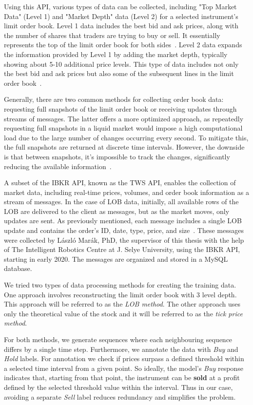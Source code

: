 \documentclass[a4paper,oneside,onecolumn,12pt]{book}
\begin{document}
	Using this API, various types of data can be collected, including "Top Market Data" (Level 1) and "Market Depth" data (Level 2) for a selected instrument's limit order book. Level 1 data includes the best bid and ask prices, along with the number of shares that traders are trying to buy or sell. It essentially represents the top of the limit order book for both sides~\cite{IL1}. Level 2 data expands the information provided by Level 1 by adding the market depth, typically showing about 5-10 additional price levels. This type of data includes not only the best bid and ask prices but also some of the subsequent lines in the limit order book~\cite{IL2}.

	Generally, there are two common methods for collecting order book data: requesting full snapshots of the limit order book or receiving updates through streams of messages. The latter offers a more optimized approach, as repeatedly requesting full snapshots in a liquid market would impose a high computational load due to the large number of changes occurring every second. To mitigate this, the full snapshots are returned at discrete time intervals. However, the downside is that between snapshots, it's impossible to track the changes, significantly reducing the available information~\cite{TLOB}.

	A subset of the IBKR API, known as the TWS API, enables the collection of market data, including real-time prices, volumes, and order book information as a stream of messages. In the case of LOB data, initially, all available rows of the LOB are delivered to the client as messages, but as the market moves, only updates are sent. As previously mentioned, each message includes a single LOB update and contains the order's ID, date, type, price, and size~\cite{TWSAPIMD}. These messages were collected by László Marák, PhD, the supervisor of this thesis with the help of The Intelligent Robotics Centre at J. Selye University, using the IBKR API, starting in early 2020. The messages are organized and stored in a MySQL database.

	We tried two types of data processing methods for creating the training data. One approach involves reconstructing the limit order book with 3 level depth. This approach will be referred to as the \textit{LOB method}. The other approach uses only the theoretical value of the stock and it will be referred to as the \textit{tick price method}. 
	
	For both methods, we generate sequences where each neighbouring sequence differs by a single time step. Furthermore, we annotate the data with \textit{Buy} and \textit{Hold} labels. For annotation we check if prices surpass a defined threshold within a selected time interval from a given point. So ideally, the model's \textit{Buy} response indicates that, starting from that point, the instrument can be \textbf{sold} at a profit defined by the selected threshold value within the interval. Thus in our case, avoiding a separate \textit{Sell} label reduces redundancy and simplifies the problem.
\end{document}

